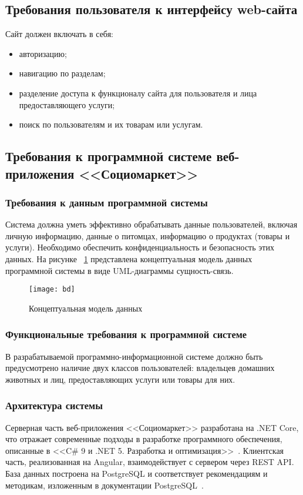 \subsection{Требования пользователя к интерфейсу web-сайта}

Сайт должен включать в себя:
\begin{itemize}
    \item авторизацию;
    \item навигацию по разделам;
    \item разделение доступа к функционалу сайта для пользователя и лица предоставляющего услуги;
    \item поиск по пользователям и их товарам или услугам.
\end{itemize}


\subsection{Требования к программной системе веб-приложения <<Социомаркет>>}
\subsubsection{Требования к данным программной системы}
Система должна уметь эффективно обрабатывать данные пользователей, включая личную информацию, данные о питомцах, информацию о продуктах (товары и услуги). Необходимо обеспечить конфиденциальность и безопасность этих данных.
На рисунке ~\ref{bd:image} представлена концептуальная модель данных программной системы в виде UML-диаграммы сущность-связь.

\begin{figure}[ht]
\centering
\texttt{[image: bd]}
\caption{Концептуальная модель данных}
\label{bd:image}
\end{figure}

\subsubsection{Функциональные требования к программной системе}
В разрабатываемой программно-информационной системе должно быть предусмотрено наличие двух классов пользователей: владельцев домашних животных и лиц, предоставляющих услуги или товары для них.

\subsubsection{Архитектура системы} 
Серверная часть веб-приложения <<Социомаркет>> разработана на .NET Core, что отражает современные подходы в разработке программного обеспечения, описанные в <<C\# 9 и .NET 5. Разработка и оптимизация>>~\cite{mark_price}. Клиентская часть, реализованная на Angular, взаимодействует с сервером через REST API. База данных построена на PostgreSQL и соответствует рекомендациям и методикам, изложенным в документации PostgreSQL~\cite{postgresql}.

